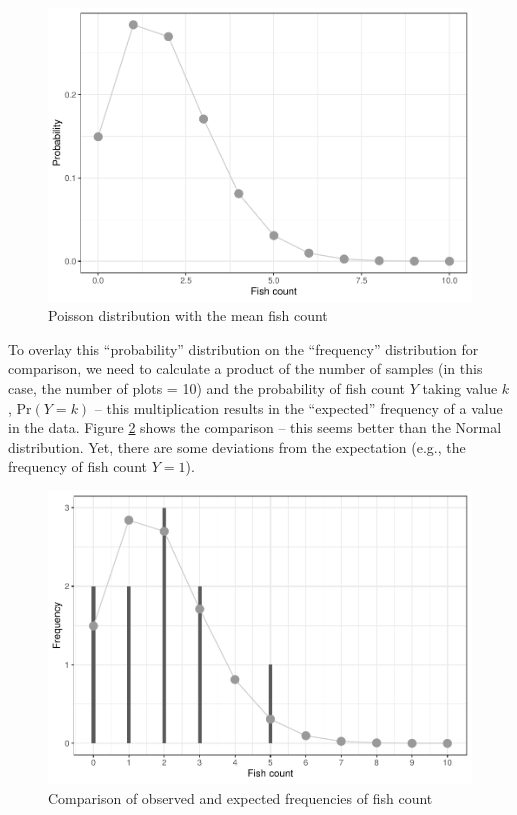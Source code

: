 \documentclass[
]{book}
\begin{document}
\begin{figure}

{\centering \includegraphics{_main_files/figure-latex/poisson-1} 

}

\caption{Poisson distribution with the mean fish count}\label{fig:poisson}
\end{figure}

To overlay this ``probability'' distribution on the ``frequency'' distribution for comparison, we need to calculate a product of the number of samples (in this case, the number of plots = 10) and the probability of fish count \(Y\) taking value \(k\), \(\text{Pr}(Y=k)\) -- this multiplication results in the ``expected'' frequency of a value in the data. Figure \ref{fig:overlay-poisson} shows the comparison -- this seems better than the Normal distribution. Yet, there are some deviations from the expectation (e.g., the frequency of fish count \(Y=1\)).

\begin{figure}

{\centering \includegraphics{_main_files/figure-latex/overlay-poisson-1} 

}

\caption{Comparison of observed and expected frequencies of fish count}\label{fig:overlay-poisson}
\end{figure}
\end{document}
